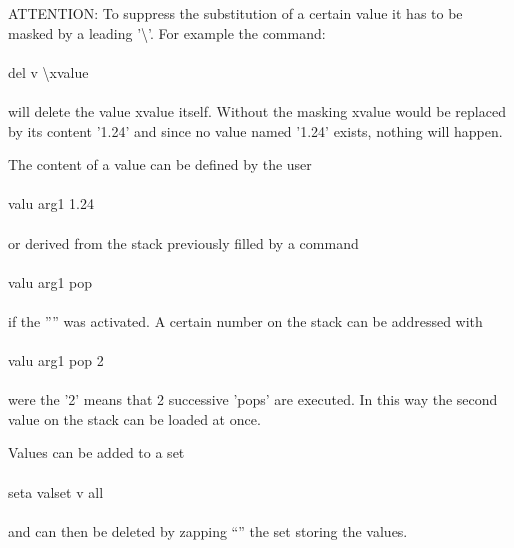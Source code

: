 \documentclass{article}
\begin{document}
ATTENTION: To suppress the substitution of a certain value it has to be masked by a leading '\textbackslash{}'. For example the command:\\\\del v \textbackslash{}xvalue\\\\will delete the value xvalue itself. Without the masking xvalue would be replaced by its content '1.24' and since no value named '1.24' exists, nothing will happen.

The content of a value can be defined by the user\\\\valu arg1 1.24\\\\or derived from the stack previously filled by a command\\\\valu arg1 pop\\\\if the '''' was activated. A certain number on the stack can be addressed with\\\\valu arg1 pop 2\\\\were the '2' means that 2 successive 'pops' are executed. In this way the second value on the stack can be loaded at once.

Values can be added to a set\\\\ seta valset v all\\\\and can then be deleted by zapping ``'' the set storing the values.
\end{document}
